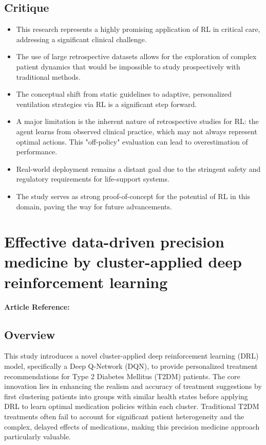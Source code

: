 \subsection*{Critique}
\begin{itemize}
    \item This research represents a highly promising application of RL in critical care, addressing a significant clinical challenge.
    \item The use of large retrospective datasets allows for the exploration of complex patient dynamics that would be impossible to study prospectively with traditional methods.
    \item The conceptual shift from static guidelines to adaptive, personalized ventilation strategies via RL is a significant step forward.
    \item A major limitation is the inherent nature of retrospective studies for RL: the agent learns from observed clinical practice, which may not always represent optimal actions. This "off-policy" evaluation can lead to overestimation of performance.
    \item Real-world deployment remains a distant goal due to the stringent safety and regulatory requirements for life-support systems.
\item The study serves as strong proof-of-concept for the potential of RL in this domain, paving the way for future advancements.
\end{itemize}
\section{Effective data-driven precision medicine by cluster-applied deep reinforcement learning}
\textbf{Article Reference:} \cite{ohEffectiveDatadrivenPrecision2022} 

\subsection*{Overview}
This study introduces a novel cluster-applied deep reinforcement learning (DRL) model, specifically a Deep Q-Network (DQN), to provide personalized treatment recommendations for Type 2 Diabetes Mellitus (T2DM) patients. The core innovation lies in enhancing the realism and accuracy of treatment suggestions by first clustering patients into groups with similar health states before applying DRL to learn optimal medication policies within each cluster. Traditional T2DM treatments often fail to account for significant patient heterogeneity and the complex, delayed effects of medications, making this precision medicine approach particularly valuable.

